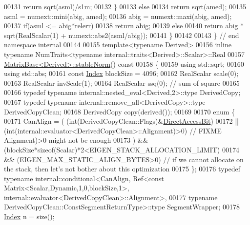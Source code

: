 \begin{DoxyCode}
00131       \textcolor{keywordflow}{return} sqrt(asml)/s1m;
00132   \}
00133   \textcolor{keywordflow}{else}
00134     \textcolor{keywordflow}{return} sqrt(amed);
00135   asml = numext::mini(abig, amed);
00136   abig = numext::maxi(abig, amed);
00137   \textcolor{keywordflow}{if}(asml <= abig*relerr)
00138     \textcolor{keywordflow}{return} abig;
00139   \textcolor{keywordflow}{else}
00140     \textcolor{keywordflow}{return} abig * sqrt(RealScalar(1) + numext::abs2(asml/abig));
00141 \}
00142 
00143 \} \textcolor{comment}{// end namespace internal}
00144 
00155 \textcolor{keyword}{template}<\textcolor{keyword}{typename} Derived>
00156 \textcolor{keyword}{inline} \textcolor{keyword}{typename} NumTraits<typename internal::traits<Derived>::Scalar>::Real
00157 \hyperlink{group___core___module_ab84d3e64f855813b1eea4202c0697dc1}{MatrixBase<Derived>::stableNorm}()\textcolor{keyword}{ const}
00158 \textcolor{keyword}{}\{
00159   \textcolor{keyword}{using} std::sqrt;
00160   \textcolor{keyword}{using} std::abs;
00161   \textcolor{keyword}{const} \hyperlink{namespace_eigen_a62e77e0933482dafde8fe197d9a2cfde}{Index} blockSize = 4096;
00162   RealScalar scale(0);
00163   RealScalar invScale(1);
00164   RealScalar ssq(0); \textcolor{comment}{// sum of square}
00165   
00166   \textcolor{keyword}{typedef} \textcolor{keyword}{typename} internal::nested\_eval<Derived,2>::type DerivedCopy;
00167   \textcolor{keyword}{typedef} \textcolor{keyword}{typename} internal::remove\_all<DerivedCopy>::type DerivedCopyClean;
00168   DerivedCopy copy(derived());
00169   
00170   \textcolor{keyword}{enum} \{
00171     CanAlign = (   (int(DerivedCopyClean::Flags)&\hyperlink{group__flags_gabf1e9d0516a933445a4c307ad8f14915}{DirectAccessBit})
00172                 || (\textcolor{keywordtype}{int}(internal::evaluator<DerivedCopyClean>::Alignment)>0) \textcolor{comment}{// FIXME Alignment)>0 might
       not be enough}
00173                ) && (blockSize*\textcolor{keyword}{sizeof}(Scalar)*2<EIGEN\_STACK\_ALLOCATION\_LIMIT)
00174                  && (EIGEN\_MAX\_STATIC\_ALIGN\_BYTES>0) \textcolor{comment}{// if we cannot allocate on the stack, then let's not
       bother about this optimization}
00175   \};
00176   \textcolor{keyword}{typedef} \textcolor{keyword}{typename} internal::conditional<CanAlign, Ref<const Matrix<Scalar,Dynamic,1,0,blockSize,1>, 
      internal::evaluator<DerivedCopyClean>::Alignment>,
00177                                                    \textcolor{keyword}{typename} DerivedCopyClean::ConstSegmentReturnType>::type
       SegmentWrapper;
00178   \hyperlink{namespace_eigen_a62e77e0933482dafde8fe197d9a2cfde}{Index} n = size();

\end{DoxyCode}
